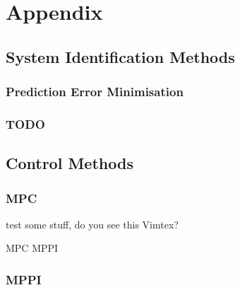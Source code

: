 \chapter{Appendix}
\section{System Identification Methods}
\subsection{Prediction Error Minimisation}
\subsection{TODO}
\section{Control Methods}
\subsection{\acs{MPC}}

test some stuff, do you see this Vimtex?

\ac{MPC}
\ac{MPPI}
\subsection{\acs{MPPI}}
